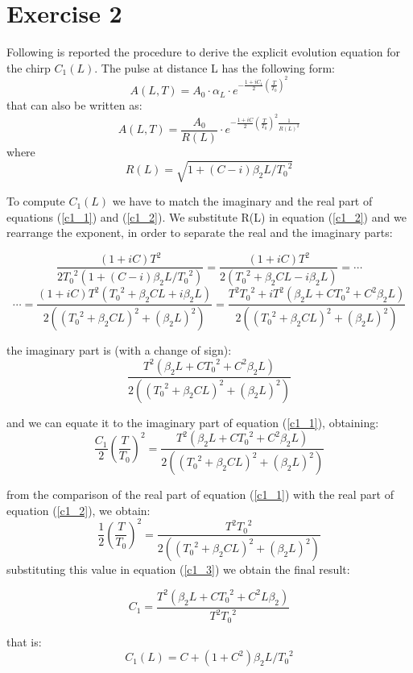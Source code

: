 \documentclass[a4paper,10pt]{report}
\begin{document}
\section*{Exercise 2}
Following is reported the procedure to derive the explicit evolution equation for the chirp $C_1(L)$.
The pulse at distance L has the following form:
\begin{equation}\label{c1_1}
 A(L,T)=A_0 \cdot \alpha_L \cdot e^{-\frac{1+i C_1}{2} \left(\frac{T}{T_0}\right)^2}
\end{equation}
that can also be written as:
\begin{equation}\label{c1_2}
 A(L,T)=\frac{A_0}{R(L)} \cdot e^{-\frac{1+i C}{2} \left(\frac{T}{T_0}\right)^2\frac{1}{R(L)^2}}
\end{equation}
where $$R(L)=\sqrt{1+(C-i)\beta_2 L/{T_0}^2}$$

To compute $C_1(L)$ we have to match the imaginary and the real part of equations (\ref{c1_1}) and (\ref{c1_2}).
We substitute R(L) in equation (\ref{c1_2}) and we rearrange the exponent, in order to separate the real and the imaginary parts:

$$\frac{(1+iC)T^2}{2{T_0}^2(1+(C-i)\beta_2L/{T_0}^2)}=\frac{(1+iC)T^2}{2({T_0}^2+\beta_2 C L-i\beta_2 L)}=\cdots$$
$$\cdots=\frac{(1+iC)T^2({T_0}^2+\beta_2 C L + i\beta_2 L)}{2(({T_0}^2+\beta_2 C L)^2+(\beta_2 L)^2)}
=\frac{T^2 {T_0}^2 + i T^2 (\beta_2 L + C {T_0}^2 + C^2 \beta_2 L)}{2(({T_0}^2+\beta_2 C L)^2+(\beta_2 L)^2)}
$$

the imaginary part is (with a change of sign):
$$\frac{T^2(\beta_2 L + {C T_0}^2 + C^2  \beta_2 L)}{2(({T_0}^2+\beta_2 C L)^2+(\beta_2 L)^2)}$$

and we can equate it to the imaginary part of equation (\ref{c1_1}), obtaining:
\begin{equation}\label{c1_3}
 \frac{C_1}{2} \left(\frac{T}{T_0}\right)^2=\frac{T^2(\beta_2 L + {C T_0}^2 + C^2  \beta_2 L)}{2(({T_0}^2+\beta_2 C L)^2+(\beta_2 L)^2)}
\end{equation}

from the comparison of the real part of equation (\ref{c1_1}) with the real part of equation (\ref{c1_2}), we obtain:
$$\frac{1}{2}\left(\frac{T}{T_0}\right)^2=\frac{T^2 {T_0}^2}{2(({T_0}^2+\beta_2 C L)^2+(\beta_2 L)^2)}$$
substituting this value in equation (\ref{c1_3}) we obtain the final result:

$$C_1 = \frac{T^2(\beta_2 L + {C T_0}^2 + C^2 L \beta_2)}{T^2 {T_0}^2}$$

that is:
\begin{equation}\label{c1_end}
 C_1(L)=C+(1+C^2)\beta_2 L / {T_0}^2
\end{equation}
\end{document}
